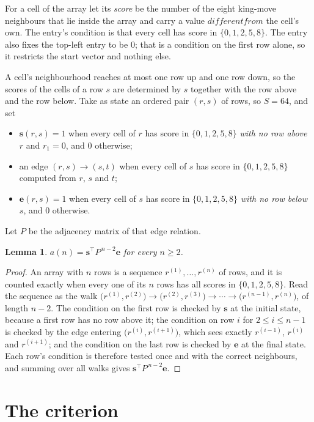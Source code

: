 \documentclass[11pt,a4paper]{article}
\theoremstyle{plain}
\newtheorem{lemma}[theorem]{Lemma}
\theoremstyle{definition}
\begin{document}
For a cell of the array let its \emph{score} be the number of the eight king-move neighbours that lie inside
the array and carry a value $different from$ the cell's own. The entry's condition is that every cell
has score in $\{0,1,2,5,8\}$. The entry also fixes the top-left entry to be $0$; that is a condition on the first row alone, so it restricts the start vector and nothing else.

A cell's neighbourhood reaches at most one row up and one row down, so the scores of the
cells of a row $s$ are determined by $s$ together with the row above and the row below.
Take as state an ordered pair $(r,s)$ of rows, so $S=64$, and set
\begin{itemize}
\item $\mathbf{s}(r,s)=1$ when every cell of $r$ has score in $\{0,1,2,5,8\}$ \emph{with no row
above $r$} and $r_1=0$, and $0$ otherwise;
\item an edge $(r,s)\to(s,t)$ when every cell of $s$ has score in $\{0,1,2,5,8\}$ computed from
$r$, $s$ and $t$;
\item $\mathbf{e}(r,s)=1$ when every cell of $s$ has score in $\{0,1,2,5,8\}$ \emph{with no row
below $s$}, and $0$ otherwise.
\end{itemize}
Let $P$ be the adjacency matrix of that edge relation.

\begin{lemma}\label{lem:walk}
$a(n)=\mathbf{s}^{\!\top}P^{\,n-2}\mathbf{e}$ for every $n\ge2$.
\end{lemma}

\begin{proof}
An array with $n$ rows is a sequence $r^{(1)},\dots,r^{(n)}$ of rows, and it is counted
exactly when every one of its $n$ rows has all scores in $\{0,1,2,5,8\}$. Read the sequence as the
walk $\bigl(r^{(1)},r^{(2)}\bigr)\to\bigl(r^{(2)},r^{(3)}\bigr)\to\cdots\to
\bigl(r^{(n-1)},r^{(n)}\bigr)$, of length $n-2$. The condition on the first row is
checked by $\mathbf{s}$ at the initial state, because a first row has no row above it; the
condition on row $i$ for $2\le i\le n-1$ is checked by the edge entering
$\bigl(r^{(i)},r^{(i+1)}\bigr)$, which sees exactly $r^{(i-1)}$, $r^{(i)}$ and
$r^{(i+1)}$; and the condition on the last row is checked by $\mathbf{e}$ at the final
state. Each row's condition is therefore tested once and with the correct neighbours, and
summing over all walks gives $\mathbf{s}^{\!\top}P^{\,n-2}\mathbf{e}$.
\end{proof}

\section{The criterion}
\end{document}
